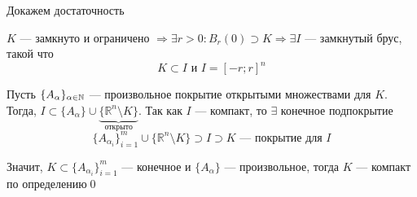 \proof Докажем достаточность

$K$ — замкнуто и ограничено $\Longrightarrow \exists r>0:B_r(0)\supset K\Longrightarrow\exists I$ — замкнутый брус, такой что
$$K\subset I\text{ и }I=[-r;r]^n$$

Пусть $\{A_{\alpha}\}_{\alpha\in\operatorname{\mathbb{N}}}$ — произвольное покрытие открытыми множествами для $K$. Тогда, $I\subset \{A_{\alpha}\}\cup\underbrace{\{\mathbb{R}^n\setminus K\}}_{\text{открыто}}$. Так как $I$ — компакт, то $\exists $ конечное подпокрытие
$$\{A_{\alpha_i}\}_{i=1}^m\cup\{\mathbb{R}^n\setminus K\}\supset I\supset K\text{ — покрытие для $I$}$$

Значит, $K\subset\{A_{\alpha_i}\}_{i=1}^{m}$ — конечное и $\{A_{\alpha}\}$ — произвольное, тогда $K$ — компакт по определению\qed

\begin{center}
    
\end{center}

